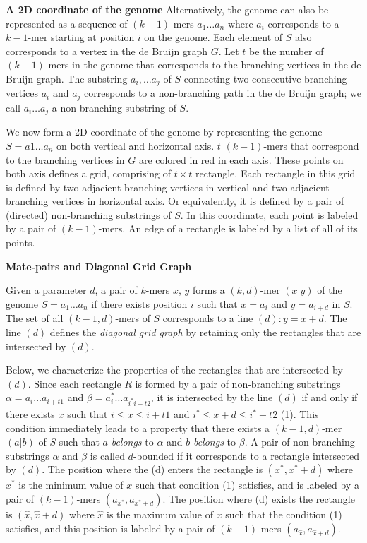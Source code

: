 \documentclass[a4paper]{article}
\begin{document}
\noindent
\textbf{A 2D coordinate of the genome}
Alternatively, the genome can also be represented as a sequence of $(k-1)$-mers $a_1\ldots a_n$ where 
$a_i$ corresponds to a $k-1$-mer starting at position $i$ on the genome. 
Each element of $S$ also corresponds to a vertex in the de Bruijn graph $G$. 
Let $t$ be the number of $(k-1)$-mers in the genome that corresponds to the branching vertices in the
de Bruijn graph. The substring $a_i, \ldots a_j$ of $S$ connecting two consecutive branching 
vertices $a_i$ and $a_j$ corresponds to a non-branching path in the de Bruijn graph; we call 
$a_i\ldots a_j$ a non-branching substring of $S$.

We now form a 2D coordinate of the genome by representing the genome $S=a1\ldots a_n$ on
both vertical and horizontal axis. $t$ $(k-1)$-mers that correspond to the branching vertices 
in $G$ are colored in red in each axis. These points on both axis defines a grid, 
comprising of $t\times t$ rectangle. Each rectangle in this grid is defined by two adjacient branching 
vertices in vertical and two adjacient branching vertices in horizontal axis. 
Or equivalently, it is defined by a pair of (directed) non-branching substrings of $S$.    
In this coordinate, each point is labeled by a pair of $(k-1)$-mers. An edge of a rectangle is labeled 
by a list of all of its points.  

\noindent
\textbf{Mate-pairs and Diagonal Grid Graph}

Given a parameter $d$, a pair of $k$-mers $x$, $y$ forms a $(k,d)$-mer $(x|y)$  %
of the genome $S = a_1\ldots a_n$ if there exists position $i$ such that $x=a_i$ and 
$y = a_{i+d}$ in $S$. The set of all $(k-1,d)$-mers of $S$ corresponds to a line $(d): y = x+d$.
The line $(d)$ defines the \emph{diagonal grid graph} by retaining only the rectangles that 
are intersected by $(d)$. 

Below, we characterize the properties of the rectangles that are intersected by $(d)$. 
Since each rectangle $R$ is formed by a pair of non-branching substrings $\alpha = a_i\ldots a_{i+t1}$
and $\beta = a_i^*\ldots a_{i^*i+ t2}$, it is intersected by the line $(d)$ if and only if 
there exists $x$ such that $i\leq x \leq i+t1$ and $ i^* \leq x + d \leq i^* + t2$ (1). This condition
immediately leads to a property that there exists a $(k-1,d)$-mer $(a|b)$ of $S$ such that 
$a$ \emph{belongs} to $\alpha$ and $b$ \emph{belongs} to $\beta$.  A pair 
of non-branching substrings $\alpha$ and $\beta$ is called $d$-bounded if it corresponds to 
a rectangle intersected by $(d)$. The position where the (d) enters the rectangle is $(x^*,x^*+d)$ where 
$x^*$ is the minimum value  of $x$ such that condition (1) satisfies, and is labeled by 
a pair of $(k-1)$-mers $(a_{x^*}, a_{x^*+d})$.  The position where (d) exists 
the rectangle is $(\hat{x}, \hat{x}+d)$ where $\hat{x}$ is the maximum value of $x$ such that the condition
(1) satisfies, and this position is labeled by a pair of $(k-1)$-mers $(a_{\hat{x}}, a_{\hat{x} +d})$.
\end{document}

